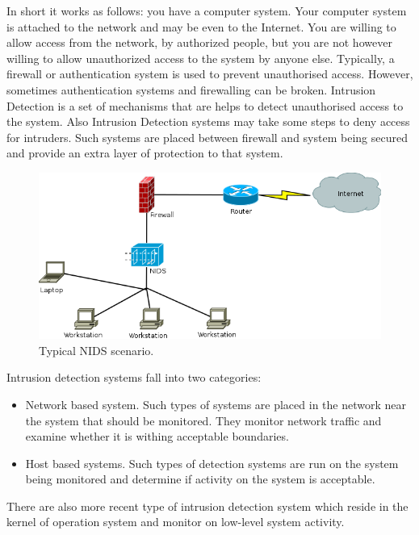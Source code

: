 \documentclass[thesis=M,english]{FITthesis}[2011/07/15]
\begin{document}
In short it works as follows: you have a computer system. Your computer system is attached to the network and may be even to the Internet. You are willing to allow access from the network, by authorized people, but you are not however willing to allow unauthorized access to the system by anyone else. Typically, a firewall or authentication system is used to prevent unauthorised access. However, sometimes authentication systems and firewalling can be broken. Intrusion Detection is a set of mechanisms that are helps to detect unauthorised access to the system. Also Intrusion Detection systems may take some steps to deny access for intruders. Such systems are placed between firewall and system being secured and provide an extra layer of protection to that system.
\begin{figure}[h]
\centering
\includegraphics[scale=0.5]{images/Typical_NIDS.png}
\caption{Typical NIDS scenario.}
\end{figure}
Intrusion detection systems fall into two categories:
\begin{itemize}
\item Network based system. 
Such types of systems are placed in the network near the system that should be monitored. They monitor network traffic and examine whether it is withing acceptable boundaries.
\item Host based systems. 
Such types of detection systems are run on the system being monitored and determine if activity on the system is acceptable.
\end{itemize}
There are also more recent type of intrusion detection system which reside in the kernel of operation system and monitor on low-level system activity.
\end{document}
